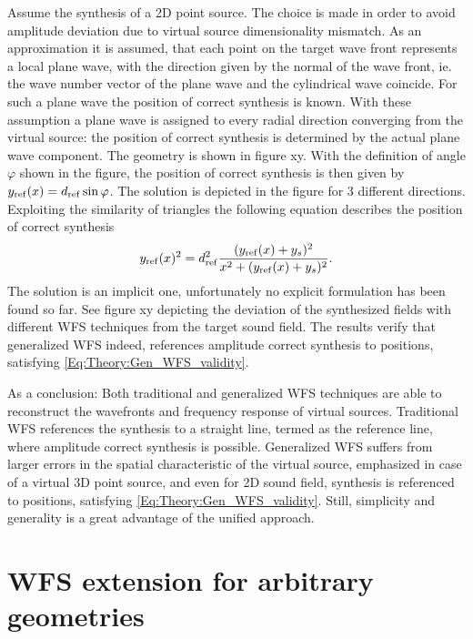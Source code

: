 Assume the synthesis of a 2D point source. The choice is made in order to avoid amplitude deviation due to virtual source dimensionality mismatch. As an approximation it is assumed, that each point on the target wave front represents a local plane wave, with the direction given by the normal of the wave front, ie. the wave number vector of the plane wave and the cylindrical wave coincide. For such a plane wave the position of correct synthesis is known. With these assumption a plane wave is assigned to every radial direction converging from the virtual source: the position of correct synthesis is determined by the actual plane wave component. 
The geometry is shown in figure xy.
With the definition of angle $\varphi$ shown in the figure, the position of correct synthesis is then given by $y_{\mathrm{ref}}(x) = d_{\mathrm{ref}} \sin\varphi$. The solution is depicted in the figure for 3 different directions.
Exploiting the similarity of triangles the following equation describes the position of correct synthesis
\begin{equation}
y_{\mathrm{ref}}(x)^2 = d_{\mathrm{ref}}^2\frac{( y_{\mathrm{ref}}(x) + y_s )^2}{x^2 + ( y_{\mathrm{ref}}(x) + y_s )^2}.
\label{Eq:Theory:Gen_WFS_validity}
\end{equation}
The solution is an implicit one, unfortunately no explicit formulation has been found so far.
See figure xy depicting the deviation of the synthesized fields with different WFS techniques from the target sound field. The results verify that generalized WFS indeed, references amplitude correct synthesis to positions, satisfying \eqref{Eq:Theory:Gen_WFS_validity}.

As a conclusion: Both traditional and generalized WFS techniques are able to reconstruct the wavefronts and frequency response of virtual sources. Traditional WFS references the synthesis to a straight line, termed as the reference line, where amplitude correct synthesis is possible. 
Generalized WFS suffers from larger errors in the spatial characteristic of the virtual source, emphasized in case of a virtual 3D point source, and even for 2D sound field, synthesis is referenced to positions, satisfying \eqref{Eq:Theory:Gen_WFS_validity}. Still, simplicity and generality is a great advantage of the unified approach.

\section{WFS extension for arbitrary geometries}